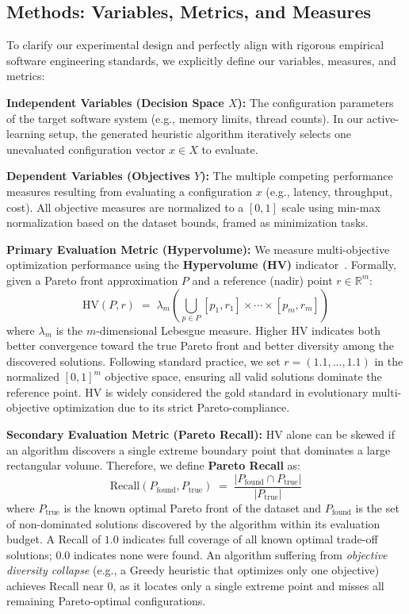 \documentclass[sigconf,nonacm]{acmart}
\begin{document}
\subsection{Methods: Variables, Metrics, and Measures}

To clarify our experimental design and perfectly align with rigorous empirical software engineering standards, we explicitly define our variables, measures, and metrics:

\textbf{Independent Variables (Decision Space $X$):} The configuration parameters of the target software system (e.g., memory limits, thread counts). In our active-learning setup, the generated heuristic algorithm iteratively selects one unevaluated configuration vector $x \in X$ to evaluate.

\textbf{Dependent Variables (Objectives $Y$):} The multiple competing performance measures resulting from evaluating a configuration $x$ (e.g., latency, throughput, cost). All objective measures are normalized to a $[0, 1]$ scale using min-max normalization based on the dataset bounds, framed as minimization tasks.

\textbf{Primary Evaluation Metric (Hypervolume):}
We measure multi-objective optimization performance using the
\textbf{Hypervolume (HV)} indicator~\cite{zitzler1999multiobjective}.
Formally, given a Pareto front approximation $P$ and a reference
(nadir) point $r \in \mathbb{R}^m$:
\[
  \text{HV}(P, r) \;=\; \lambda_m\!\left(\bigcup_{p \in P}
  [p_1, r_1] \times \cdots \times [p_m, r_m]\right)
\]
where $\lambda_m$ is the $m$-dimensional Lebesgue measure. Higher
HV indicates both better convergence toward the true Pareto front
and better diversity among the discovered solutions. Following
standard practice, we set $r = (1.1, \ldots, 1.1)$ in the
normalized $[0,1]^m$ objective space, ensuring all valid solutions
dominate the reference point. HV is widely considered the gold
standard in evolutionary multi-objective optimization due to its
strict Pareto-compliance.

\textbf{Secondary Evaluation Metric (Pareto Recall):}
HV alone can be skewed if an algorithm discovers a single extreme
boundary point that dominates a large rectangular volume.
Therefore, we define \textbf{Pareto Recall} as:
\[
  \text{Recall}(P_{\text{found}}, P_{\text{true}}) \;=\;
  \frac{|P_{\text{found}} \cap P_{\text{true}}|}{|P_{\text{true}}|}
\]
where $P_{\text{true}}$ is the known optimal Pareto front of the
dataset and $P_{\text{found}}$ is the set of non-dominated
solutions discovered by the algorithm within its evaluation budget.
A Recall of $1.0$ indicates full coverage of all known optimal
trade-off solutions; $0.0$ indicates none were found. An algorithm
suffering from \emph{objective diversity collapse} (e.g., a Greedy
heuristic that optimizes only one objective) achieves Recall near
$0$, as it locates only a single extreme point and misses all
remaining Pareto-optimal configurations.
\end{document}
